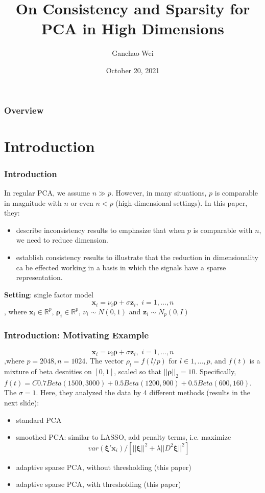 \documentclass{beamer}
\title[ASPCA]{On Consistency and Sparsity for PCA in High Dimensions}
\author{Ganchao Wei}
\date{October 20, 2021}
\begin{document}
	
	\begin{frame}
		\titlepage %
	\end{frame}
	
	\begin{frame}
		\frametitle{Overview} %
		\tableofcontents
	\end{frame}
	
	
	\section{Introduction}
	
	\begin{frame}
		\frametitle{Introduction}
		In regular PCA, we assume $n \gg p$. However, in many situations, $p$ is comparable in magnitude with $n$ or even $n < p$ (high-dimensional settings). In this paper, they:
		\begin{itemize}
			\item
			describe inconsistency results to emphasize that when $p$ is comparable with $n$, we need to reduce dimension.
			\item
			establish consistency results to illustrate that the reduction in dimensionality ca be effected working in a basis in which the signals have a sparse representation.
		\end{itemize}
		\textbf{Setting}: single factor model
		$$\bm{x}_i=\nu_i\bm{\rho} + \sigma\bm{z}_i,\,\, i=1,\ldots,n$$
		, where $\bm{x}_i \in \mathbb{R}^p$,  $\bm{\rho}_i \in \mathbb{R}^p$, $\nu_i\sim N(0,1)$ and $\bm{z}_i\sim N_p(0,I)$
	\end{frame}
	
	\begin{frame}
		\frametitle{Introduction: Motivating Example}
		$$\bm{x}_i=\nu_i\bm{\rho} + \sigma\bm{z}_i,\,\, i=1,\ldots,n$$
		,where $p=2048, n= 1024$. The vector $\rho_l=f(l/p)$ for $l\in {1,\ldots,p}$, and $f(t)$ is a mixture of beta desnities on $[0,1]$, scaled so that $||\bm{\rho}||_2 = 10$. Specifically, $f(t) = C{0.7Beta(1500,3000) + 0.5Beta(1200,900) + 0.5Beta(600,160)}$. The $\sigma=1$. Here, they analyzed the data by 4 different methods (results in the next slide):
		\begin{itemize}
			\item
			standard PCA
			\item
			smoothed PCA: similar to LASSO, add penalty terms, i.e. maximize
			$$var(\bm{\xi}'\bm{x}_i)/[||\bm{\xi}||^2 + \lambda ||D^2\bm{\xi}||^2]$$
			\item
			adaptive sparse PCA, without thresholding (this paper)
			\item
			adaptive sparse PCA, with thresholding (this paper)
		\end{itemize} 
	\end{frame}
	
\end{document}
